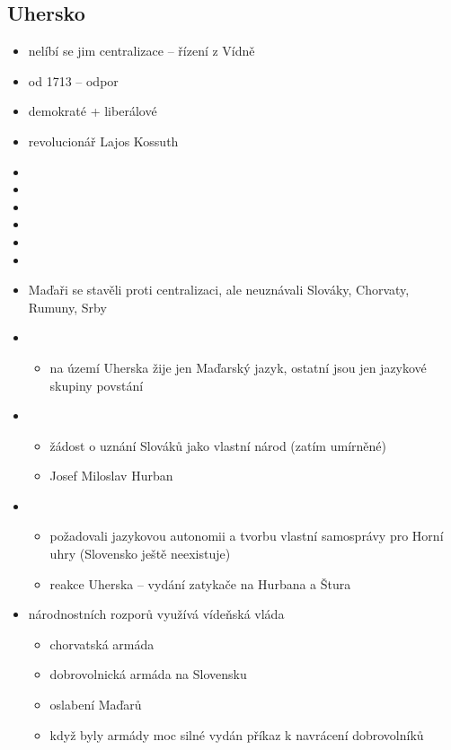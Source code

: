 \subsection{Uhersko}
\begin{itemize}
\item nelíbí se jim centralizace -- řízení z Vídně
\item od 1713 -- odpor
\item demokraté + liberálové
\item revolucionář Lajos Kossuth
\item {}
\item {}
\item 
\item
\item 
\item {}
\item Maďaři se stavěli proti centralizaci, ale neuznávali Slováky, Chorvaty, Rumuny, Srby
\item {}
	\begin{itemize}
	\item na území Uherska žije jen Maďarský jazyk, ostatní jsou jen jazykové skupiny \ra povstání
	\end{itemize}
\item {}
	\begin{itemize}
	\item žádost o uznání Slováků jako vlastní národ (zatím umírněné)
	\item Josef Miloslav Hurban
	\end{itemize}
\item {}
	\begin{itemize}
	\item požadovali jazykovou autonomii a tvorbu vlastní samosprávy pro Horní uhry (Slovensko ještě neexistuje)
	\item reakce Uherska -- vydání zatykače na Hurbana a Štura
	\end{itemize}
\item národnostních rozporů využívá vídeňská vláda
	\begin{itemize}
	\item chorvatská armáda
	\item dobrovolnická armáda na Slovensku
	\item[\ra] oslabení Maďarů
	\item když byly armády moc silné \ra vydán příkaz k navrácení dobrovolníků
	\end{itemize}
\end{itemize}

